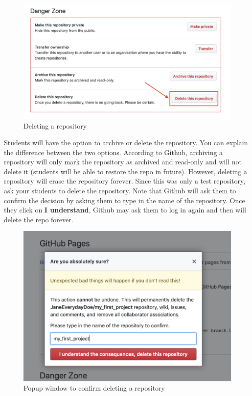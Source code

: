 \documentclass[]{book}
\begin{document}
\begin{figure}
\centering
\includegraphics{./images/deleting_repo.png}
\caption{Deleting a repository}
\end{figure}

Students will have the option to archive or delete the repository. You can explain the difference between the two options. According to Github, archiving a repository will only mark the repository as archived and read-only and will not delete it (students will be able to restore the repo in future). However, deleting a repository will erase the repository forever. Since this was only a test repository, ask your students to delete the repository. Note that Github will ask them to confirm the decision by asking them to type in the name of the repository. Once they click on \textbf{I understand}, Github may ask them to log in again and then will delete the repo forever.

\begin{figure}
\centering
\includegraphics{./images/deleting_repo_popup.png}
\caption{Popup window to confirm deleting a repository}
\end{figure}
\end{document}
